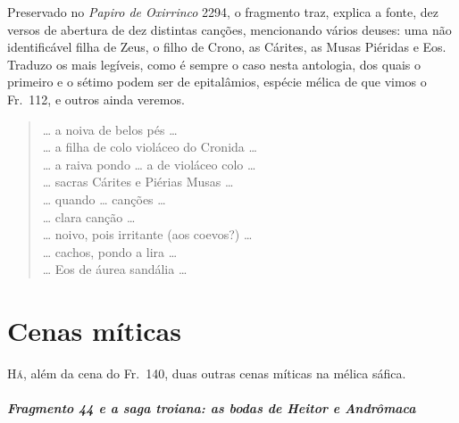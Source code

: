 {\small Preservado  no \textit{Papiro de Oxirrinco} 2294, o fragmento traz, explica a fonte, dez versos de abertura de dez distintas canções, mencionando vários deuses: uma não identificável filha de Zeus, o filho de Crono, as Cárites, as Musas Piéridas e Eos. Traduzo os mais legíveis, como é sempre o caso nesta antologia, dos quais o primeiro e o sétimo podem ser de epitalâmios, espécie mélica de que vimos o Fr.~112, e outros ainda veremos.}

\begin{verse}
\ldots{} a noiva de belos pés \ldots{}\\[10pt]
\ldots{} a filha de colo violáceo do Cronida \ldots{}\\[10pt]
\ldots{} a raiva pondo \ldots{} a de violáceo colo \ldots{}\\[10pt]
\ldots{} sacras Cárites e Piérias Musas \ldots{}\\[10pt]
\ldots{} quando \ldots{} canções \ldots{}\\[10pt]
\ldots{} clara canção \ldots{}\\[10pt]
\ldots{} noivo, pois irritante (aos coevos?) \ldots{}\\[10pt]
\ldots{} cachos, pondo a lira \ldots{}\\[10pt]
\ldots{} Eos de áurea sandália \ldots{}\\[10pt]
\end{verse}

\chapter{Cenas míticas}

\textsc{Há,} além da cena do Fr.~140, duas outras cenas míticas na mélica sáfica.

\paragraph[Fragmento 44 e a saga troiana: as bodas de Heitor]{Fragmento 44 e a saga troiana: as bodas de Heitor e Andrômaca}

